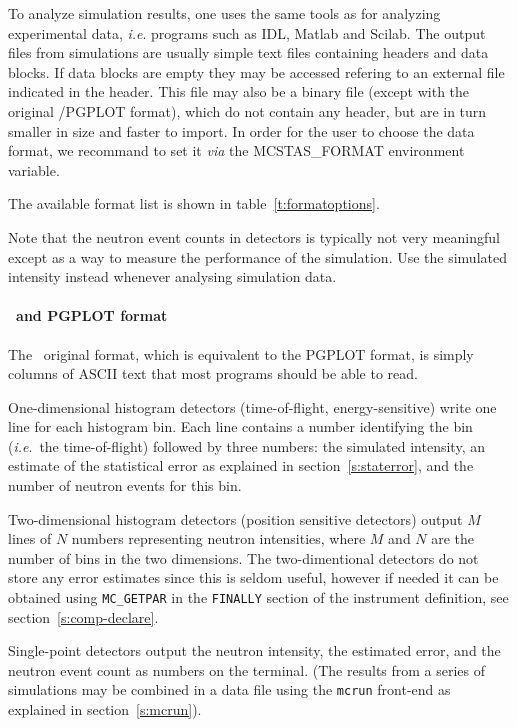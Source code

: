 To analyze simulation results, one uses the same tools as for analyzing
experimental data, \textit{i.e}. programs such as IDL, Matlab and Scilab.
The output files from simulations are usually simple text files containing headers and data blocks. If data blocks are empty they may be accessed refering to an external file indicated in the header. This file may also be a binary file (except with the original \MCS /PGPLOT format), which do not contain any header, but are in turn smaller in size and faster to import. In order for the user to choose the data format, we recommand to set it {\it via} the MCSTAS\_FORMAT environment variable. 

The available format list is shown in table~\ref{t:formatoptions}. 

Note that the neutron event counts in detectors is typically not very
meaningful except as a way to measure the performance of the
simulation. Use the simulated intensity instead whenever analysing
simulation data.

\paragraph{\MCS\ and PGPLOT format}

The \MCS\ original format, which is equivalent to the PGPLOT format, is simply columns of ASCII text that most programs should
be able to read. 

One-dimensional histogram detectors (time-of-flight, energy-sensitive)
write one line for each histogram bin. Each line contains a number
identifying the bin (\textit{i.e}.\ the time-of-flight) followed by
three numbers: the simulated intensity, an estimate of the statistical
error as explained in section~\ref{s:staterror}, and the number of
neutron events for this bin.

Two-dimensional histogram detectors (position sensitive detectors)
output $M$ lines of $N$ numbers representing neutron intensities, where
$M$ and $N$ are the number of bins in the two dimensions. The
two-dimentional detectors do not store any error estimates since this is
seldom useful, however if needed it can be obtained using
\verb+MC_GETPAR+ in the \verb+FINALLY+ section of the instrument
definition, see section~\ref{s:comp-declare}.

Single-point detectors output the neutron intensity, the estimated
error, and the neutron event count as numbers on the
terminal. (The results from a series of simulations may be combined in a
data file using the \verb+mcrun+ front-end as explained in
section~\ref{s:mcrun}).

